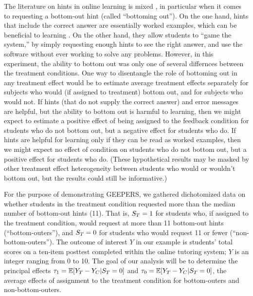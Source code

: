 \documentclass[11pt]{article} %
\begin{document}
The literature on hints in online learning is mixed \citep{stuff}, in particular when it comes to requesting a bottom-out hint (called ``bottoming out''). On the one hand, hints that include the correct answer are essentially worked examples, which can be beneficial to learning \citep{worked example stuff}. On the other hand, they allow students to ``game the system,'' by simply requesting enough hints to see the right answer, and use the software without ever working to solve any problems. However, in this experiment, the ability to bottom out was only one of several differnces between the treatment conditions. One way to disentangle the role of bottoming out in any treatment effect would be to estimate average treatment effects separately for subjects who would (if assigned to treatment) bottom out, and for subjects who would not. If hints (that do not supply the correct answer) and error messages are helpful, but the ability to bottom out is harmful to learning, then we might expect to estimate a positive effect of being assigned to the feedback condition for students who do not bottom out, but a negative effect for students who do. If hints are helpful for learning only if they can be read as worked examples, then we might expect no effect of condition on students who do not bottom out, but a positive effect for students who do. (These hypothetical results may be masked by other treatment effect heterogeneity between students who would or wouldn't bottom out, but the results could still be informative.)

For the purpose of demonstrating GEEPERS, we gathered dichotomized data on %
whether students in the treatment condition requested more than the median number of bottom-out hints (11).
That is, $S_T=1$ for students who, if assigned to the treatment condition, would request at more than 11 bottom-out hints (``bottom-outers''), and $S_T=0$ for students who would request 11 or fewer (``non-bottom-outers''). %
The outcome of interest $Y$ in our example is students' total scores on a ten-item posttest completed within the online tutoring system; $Y$ is an integer ranging from 0 to 10.
The goal of our analysis will be to determine the principal effects $\tau_1=\mathbb{E}[Y_T-Y_C|S_T=0]$ and $\tau_0=\mathbb{E}[Y_T-Y_C|S_T=0]$, the average effects of assignment to the treatment condition for bottom-outers and non-bottom-outers.
\end{document}
